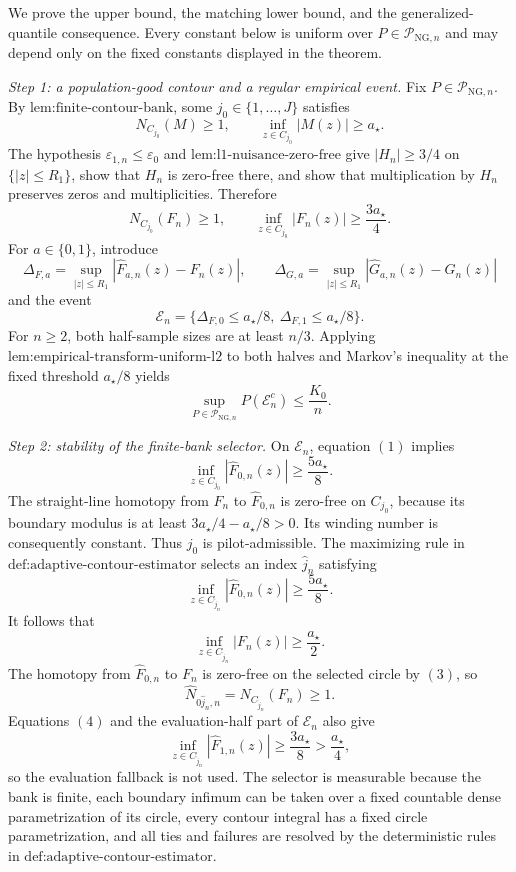 We prove the upper bound, the matching lower bound, and the generalized-quantile consequence. Every constant below is uniform over \(P\in\mathcal P_{\mathrm{NG},n}\) and may depend only on the fixed constants displayed in the theorem.

\emph{Step 1: a population-good contour and a regular empirical event.}
Fix \(P\in\mathcal P_{\mathrm{NG},n}\). By \(\text{lem:finite-contour-bank}\), some \(j_0\in\{1,\ldots,J\}\) satisfies
\[
 N_{C_{j_0}}(M)\ge1,
 \qquad
 \inf_{z\in C_{j_0}}|M(z)|\ge a_{\star}.
\]
The hypothesis \(\varepsilon_{1,n}\le\varepsilon_0\) and \(\text{lem:l1-nuisance-zero-free}\) give \(|H_n|\ge3/4\) on \(\{|z|\le R_1\}\), show that \(H_n\) is zero-free there, and show that multiplication by \(H_n\) preserves zeros and multiplicities. Therefore
\[
 N_{C_{j_0}}(F_n)\ge1,
 \qquad
 \inf_{z\in C_{j_0}}|F_n(z)|\ge\frac{3a_{\star}}4. \tag{1}
\]
For \(a\in\{0,1\}\), introduce
\[
 \Delta_{F,a}=\sup_{|z|\le R_1}|\widehat F_{a,n}(z)-F_n(z)|,
 \qquad
 \Delta_{G,a}=\sup_{|z|\le R_1}|\widehat G_{a,n}(z)-G_n(z)|
\]
and the event
\[
 \mathcal E_n=\{\Delta_{F,0}\le a_{\star}/8,\ \Delta_{F,1}\le a_{\star}/8\}.
\]
For \(n\ge2\), both half-sample sizes are at least \(n/3\). Applying \(\text{lem:empirical-transform-uniform-l2}\) to both halves and Markov's inequality at the fixed threshold \(a_{\star}/8\) yields
\[
 \sup_{P\in\mathcal P_{\mathrm{NG},n}}P(\mathcal E_n^c)\le\frac{K_0}{n}. \tag{2}
\]

\emph{Step 2: stability of the finite-bank selector.}
On \(\mathcal E_n\), equation \((1)\) implies
\[
 \inf_{z\in C_{j_0}}|\widehat F_{0,n}(z)|\ge\frac{5a_{\star}}8.
\]
The straight-line homotopy from \(F_n\) to \(\widehat F_{0,n}\) is zero-free on \(C_{j_0}\), because its boundary modulus is at least \(3a_{\star}/4-a_{\star}/8>0\). Its winding number is consequently constant. Thus \(j_0\) is pilot-admissible. The maximizing rule in \(\text{def:adaptive-contour-estimator}\) selects an index \(\widehat j_n\) satisfying
\[
 \inf_{z\in C_{\widehat j_n}}|\widehat F_{0,n}(z)|\ge\frac{5a_{\star}}8. \tag{3}
\]
It follows that
\[
 \inf_{z\in C_{\widehat j_n}}|F_n(z)|\ge\frac{a_{\star}}2. \tag{4}
\]
The homotopy from \(\widehat F_{0,n}\) to \(F_n\) is zero-free on the selected circle by \((3)\), so
\[
 \widehat N_{0\widehat j_n,n}=N_{C_{\widehat j_n}}(F_n)\ge1. \tag{5}
\]
Equations \((4)\) and the evaluation-half part of \(\mathcal E_n\) also give
\[
 \inf_{z\in C_{\widehat j_n}}|\widehat F_{1,n}(z)|\ge\frac{3a_{\star}}8>\frac{a_{\star}}4, \tag{6}
\]
so the evaluation fallback is not used. The selector is measurable because the bank is finite, each boundary infimum can be taken over a fixed countable dense parametrization of its circle, every contour integral has a fixed circle parametrization, and all ties and failures are resolved by the deterministic rules in \(\text{def:adaptive-contour-estimator}\).

